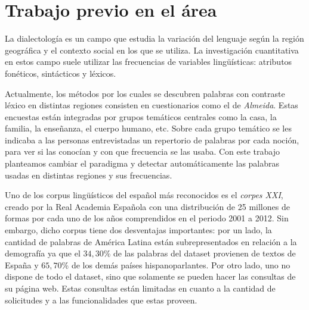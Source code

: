 





\section{Trabajo previo en el área}
La dialectología es un campo que estudia la variación del lenguaje según la región geográfica y el contexto social en los que se utiliza. La investigación cuantitativa en estos campo suele utilizar las frecuencias de variables lingüísticas: atributos fonéticos, sintácticos y léxicos.


Actualmente, los métodos por los cuales se descubren palabras con contraste léxico en distintas regiones
consisten en cuestionarios como el de \emph{Almeida}\cite{almeida1995variacion}.  Estas encuestas están integradas por grupos temáticos centrales como la casa, la familia, la enseñanza, el cuerpo humano, etc. Sobre cada grupo temático se les indicaba a las personas entrevistadas un repertorio de palabras por cada noción, para ver si las conocían y con que frecuencia se las usaba. 
Con este trabajo planteamos cambiar el paradigma y detectar automáticamente las palabras usadas en distintas regiones y sus frecuencias.

Uno de los corpus lingüísticos del español más reconocidos es el \emph{corpes XXI}\cite{espanolabanco}, creado por la Real Academia Española con una distribución de 25 millones de formas por cada uno de los años comprendidos en el periodo 2001 
a 2012. Sin embargo, dicho corpus tiene dos desventajas importantes: por un
lado, la cantidad de palabras de América Latina están subrepresentados en relación a la demografía ya que el $34,30$\% de las palabras del dataset provienen de textos de España y $65,70$\% de los demás países hispanoparlantes. Por otro lado, uno no dispone de todo el dataset, sino que solamente se pueden hacer las consultas de su página web. Estas consultas están limitadas en cuanto a la cantidad de solicitudes y a las funcionalidades que estas proveen.

